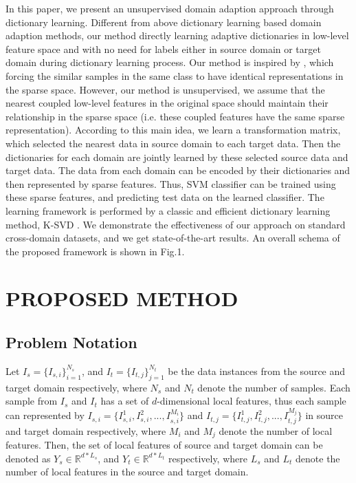 \documentclass{article}
\begin{document}
In this paper, we present an unsupervised domain adaption approach through dictionary learning. Different from above dictionary learning based domain adaption methods, our method directly learning adaptive dictionaries in low-level feature space and with no need for labels either in source domain or target domain during dictionary learning process. Our method is inspired by \cite{zhu2013enhancing,zhu2014weakly}, which forcing the similar samples in the same class to have identical representations in the sparse space. However, our method is unsupervised, we assume that the nearest coupled low-level features in the original space should maintain their relationship in the sparse space (i.e. these coupled features have the same sparse representation).  According to this main idea, we learn a transformation matrix, which selected the nearest data in source domain to each target data. Then the dictionaries for each domain are jointly learned by these selected source data and target data. The data from each domain can be encoded by their dictionaries and then represented by sparse features. Thus, SVM classifier can be trained using these sparse features, and predicting test data on the learned classifier. The learning framework is performed by a classic and efficient dictionary learning method, K-SVD \cite{aharon2006svd}. We demonstrate the effectiveness of our approach on standard cross-domain datasets, and we get state-of-the-art results.  An overall schema of the proposed framework is shown in Fig.1.











\section{PROPOSED METHOD}
\label{sec:2}



\subsection{Problem Notation}
\label{ssec:2.1}
Let
\(I_{s} = \{I_{s,i}\}_{i=1}^{N_s}\), and
\(I_t = \{I_{t,j}\}_{j=1}^{N_t}\) be the data instances from the source and target domain respectively, where
\(N_s\) and
\(N_t\) denote the number of samples. Each sample from
\(I_s\) and
\(I_t\)
has a set of
\(d\)-dimensional local features, thus each sample can represented by
\(I_{s,i}=\{I_{s,i}^1,I_{s,i}^2,...,I_{s,i}^{M_i}\}\)
and
\(I_{t,j}=\{I_{t,j}^1,I_{t,j}^2,...,I_{t,j}^{M_j}\}\)
in source and target domain respectively, where
\(M_i\)
and
\(M_j\)
denote the number of local features. Then, the set of local features of source and target domain can be denoted as
\(Y_s\in\mathbb{R}^{d*L_s}\), and \(Y_t\in\mathbb{R}^{d*L_t}\) respectively, where
\(L_s\) and
\(L_t\) denote the number of local features in the source and target domain.
\end{document}
